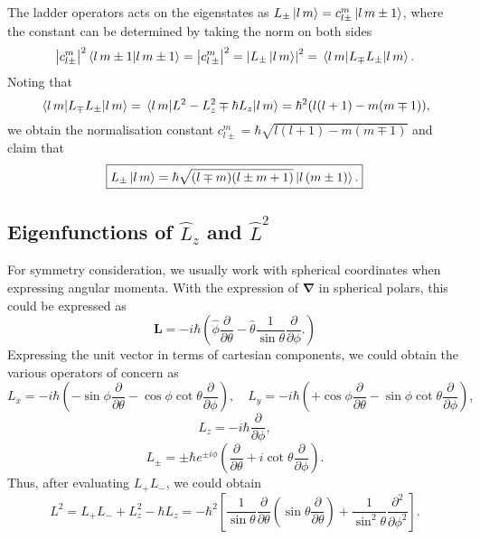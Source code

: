 \documentclass{article}
\theoremstyle{nonumberplain}
\begin{document}
The ladder operators acts on the eigenstates as $L_{\pm} \ket{l \, m} = c_{l \pm}^m \ket{l \, m \pm 1} $, where the constant can be determined by taking the norm on both sides 
\[
    \left\vert c_{l \pm}^m \right\vert ^2 \braket{l\, m \pm 1} 
    = \left\vert c_{l\, \pm}^m \right\vert ^2
    = \left\vert {L_{\pm}} \ket{l\, m} \right\vert^2
    = \ev{L_{\mp} L_{\pm}}{l\, m}.
\]
Noting that
\[
    \ev{L_{\mp} L_{\pm}}{l\, m} = \ev{L^2 - L_z^2 \mp \hbar  L_z}{l\,m}
    = \hbar^2 (l(l+1) - m(m \mp 1)),
\]
we obtain the normalisation constant $c_{l \pm}^m = \hbar \sqrt{l(l+1) - m(m \mp 1)}$ and claim that 
\[
    \boxed{
        L_{\pm} \ket{l \, m}
        = \hbar \sqrt{(l \mp m) (l \pm m + 1)} \ket{l \, (m\pm 1)}. 
    }
\]
\subsection{Eigenfunctions of $\hat{L} _z$ and $\hat{L} ^2$} \label{sec:eigenfunction}
For symmetry consideration, we usually work with spherical coordinates when expressing angular momenta. With the expression of $\mathbf{\nabla}$ in spherical polars, this could be expressed as 
\[
    \mathbf{L}  = 
    -i \hbar  \left( 
        \hat{\phi} \frac{\partial }{\partial \theta } - \hat{\theta} \frac{1}{\sin \theta } \frac{\partial }{\partial \phi} .
    \right)
\]
Expressing the unit vector in terms of cartesian components, we could obtain the various operators of concern as 
\[
    L_x = - i \hbar \left( 
        -\sin \phi \frac{\partial }{\partial \theta } - \cos \phi  \cot \theta \frac{\partial }{\partial \phi } 
    \right), \quad 
    L_y = -i \hbar \left( 
        + \cos{\phi} \frac{\partial }{\partial \theta } - \sin \phi  \cot \theta \frac{\partial }{\partial \phi } 
    \right),
\]
\[
    \boxed{
        L_z = -i \hbar \frac{\partial }{\partial \phi } ,
    }
\]
\[
    L_{\pm} = \pm \hbar  e^{\pm i \phi } \left( 
        \frac{\partial }{\partial \theta } + i \cot \theta \frac{\partial }{\partial \phi }
    \right). 
\]
Thus, after evaluating $L_+ L_-$, we could obtain 
\[
    \boxed{
        L^2 = L_+ L_- + L_z^2 - \hbar L_z 
        = -\hbar^2 \left[ 
            \frac{1}{\sin \theta } \frac{\partial }{\partial \theta } \left( 
                \sin \theta \frac{\partial }{\partial \theta } 
            \right) + \frac{1}{\sin ^2 \theta } \frac{\partial ^2 }{\partial \phi ^2 } 
        \right].
    }
\]
\end{document}
